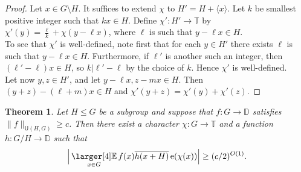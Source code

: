 \documentclass[a4paper,11pt]{article}
\newtheorem{theorem}{Theorem}
\numberwithin{theorem}{section}
\theoremstyle{definition}
\newcommand{\on}[1]{
	\operatorname{#1}
}
\newcommand{\exx}{
  \mathop{
    \mathchoice{\vcenter{\hbox{\larger[4]$\mathbb{E}$}}}
               {\kern0pt\mathbb{E}}
               {\kern0pt\mathbb{E}}
               {\kern0pt\mathbb{E}}
  }\displaylimits
}
\begin{document}
\begin{proof}
    Let $x \in G \setminus H$. It suffices to extend $\chi$ to $H' = H + \langle x \rangle$. Let $k$ be smallest positive integer such that $kx \in H$. Define $\chi' : H' \to \mathbb{T}$ by $\chi'(y) = \frac{\ell}{k} + \chi(y - \ell x)$, where $\ell$ is such that $y - \ell x \in H$.\\
    \indent To see that $\chi'$ is well-defined, note first that for each $y \in H'$ there exists $\ell$ is such that $y - \ell x \in H$. Furthermore, if $\ell'$ is another such an integer, then $(\ell' - \ell) x \in H$, so $k | \ell' - \ell$ by the choice of $k$. Hence $\chi'$ is well-defined.\\
    \indent Let now $y, z\in H'$, and let $y - \ell x, z - mx \in H$. Then $(y + z) - (\ell + m)x \in H$ and $\chi'(y+z) = \chi'(y)+\chi'(z)$.
\end{proof}

\begin{theorem}\label{u2inversesbgp}
Let $H \leq G$ be a subgroup and suppose that $f : G \to \mathbb{D}$ satisfies $\|f\|_{\mathsf{U}(H, G)} \geq c$. Then there exist a character $\chi : G \to \mathbb{T}$ and a function $h : G/H \to \mathbb{D}$ such that 
\[\Big|\exx_{x \in G} f(x) \overline{h(x + H)} \on{e}(\chi(x))\Big| \geq (c/2)^{O(1)}.\]
\end{theorem}
\end{document}
